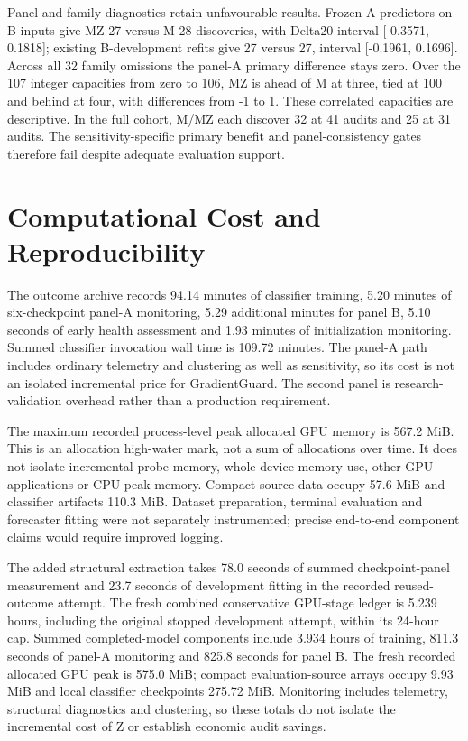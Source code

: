 Panel and family diagnostics retain unfavourable results. Frozen A predictors on B inputs give MZ 27 versus M 28 discoveries, with Delta20 interval [-0.3571, 0.1818]; existing B-development refits give 27 versus 27, interval [-0.1961, 0.1696]. Across all 32 family omissions the panel-A primary difference stays zero. Over the 107 integer capacities from zero to 106, MZ is ahead of M at three, tied at 100 and behind at four, with differences from -1 to 1. These correlated capacities are descriptive. In the full cohort, M/MZ each discover 32 at 41 audits and 25 at 31 audits. The sensitivity-specific primary benefit and panel-consistency gates therefore fail despite adequate evaluation support.

\section{Computational Cost and Reproducibility}
\label{sec:cost}
The outcome archive records 94.14 minutes of classifier training, 5.20 minutes of six-checkpoint panel-A monitoring, 5.29 additional minutes for panel B, 5.10 seconds of early health assessment and 1.93 minutes of initialization monitoring. Summed classifier invocation wall time is 109.72 minutes. The panel-A path includes ordinary telemetry and clustering as well as sensitivity, so its cost is not an isolated incremental price for GradientGuard. The second panel is research-validation overhead rather than a production requirement.

The maximum recorded process-level peak allocated GPU memory is 567.2 MiB. This is an allocation high-water mark, not a sum of allocations over time. It does not isolate incremental probe memory, whole-device memory use, other GPU applications or CPU peak memory. Compact source data occupy 57.6 MiB and classifier artifacts 110.3 MiB. Dataset preparation, terminal evaluation and forecaster fitting were not separately instrumented; precise end-to-end component claims would require improved logging.

The added structural extraction takes 78.0 seconds of summed checkpoint-panel measurement and 23.7 seconds of development fitting in the recorded reused-outcome attempt. The fresh combined conservative GPU-stage ledger is 5.239 hours, including the original stopped development attempt, within its 24-hour cap. Summed completed-model components include 3.934 hours of training, 811.3 seconds of panel-A monitoring and 825.8 seconds for panel B. The fresh recorded allocated GPU peak is 575.0 MiB; compact evaluation-source arrays occupy 9.93 MiB and local classifier checkpoints 275.72 MiB. Monitoring includes telemetry, structural diagnostics and clustering, so these totals do not isolate the incremental cost of Z or establish economic audit savings.

